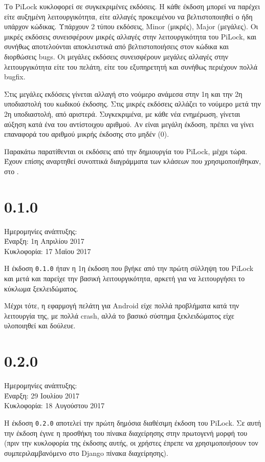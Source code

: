 Το PiLock κυκλοφορεί σε συγκεκριμένες εκδόσεις. Η κάθε έκδοση μπορεί να παρέχει είτε αυξημένη λειτουργικότητα, είτε αλλαγές προκειμένου να βελτιστοποιηθεί ο ήδη υπάρχον κώδικας. Υπάρχουν 2 τύπου εκδόσεις, Minor (μικρές), Major (μεγάλες). Οι μικρές εκδόσεις συνεισφέρουν μικρές αλλαγές στην λειτουργικότητα του PiLock, και συνήθως αποτελούνται αποκλειστικά από βελτιστοποιήσεις στον κώδικα και διορθώσεις bugs. Οι μεγάλες εκδόσεις συνεισφέρουν μεγάλες αλλαγές στην λειτουργικότητα είτε του πελάτη, είτε του εξυπηρετητή και συνήθως περιέχουν πολλά bugfix.

Στις μεγάλες εκδόσεις γίνεται αλλαγή στο νούμερο ανάμεσα στην 1η και την 2η υποδιαστολή του κωδικού έκδοσης. Στις μικρές εκδόσεις αλλάζει το νούμερο μετά την 2η υποδιαστολή, από αριστερά. Συγκεκριμένα, με κάθε νέα ενημέρωση, γίνεται αύξηση κατά ένα του αντίστοιχου αριθμού. Αν είναι μεγάλη έκδοση, πρέπει να γίνει επαναφορά του αριθμού μικρής έκδοσης στο μηδέν (0).

Παρακάτω παρατίθενται οι εκδόσεις από την δημιουργία του PiLock, μέχρι τώρα. Έχουν επίσης αναρτηθεί συνοπτικά διαγράμματα των κλάσεων που χρησιμοποιήθηκαν, στο .

\section{0.1.0}
	Ημερομηνίες ανάπτυξης:\\Έναρξη: 1η Απριλίου 2017\\Κυκλοφορία: 17 Μαϊου 2017

	Η έκδοση \verb|0.1.0| ήταν η 1η έκδοση που βγήκε από την πρώτη σύλληψη του PiLock και μετά και παρείχε την βασική λειτουργικότητα, αρκετή για να λειτουργήσει το κύκλωμα ξεκλειδώματος. 

	Μέχρι τότε, η εφαρμογή πελάτη για Android είχε πολλά προβλήματα κατά την λειτουργία της, με πολλά crash, αλλά το βασικό σύστημα ξεκλειδώματος είχε υλοποιηθεί και δούλευε.

\section{0.2.0}
	Ημερομηνίες ανάπτυξης:\\Έναρξη: 29 Ιουλίου 2017\\Κυκλοφορία: 18 Αυγούστου 2017

	Η έκδοση \verb|0.2.0| αποτελεί την πρώτη δημόσια διαθέσιμη έκδοση του PiLock. Σε αυτή την έκδοση έγινε η προσθήκη του πίνακα διαχείρησης στην πρωτογενή μορφή του (πριν την κυκλοφορία της έκδοσης αυτής, οι χρήστες έπρεπε να χρησιμοποιήσουν τον συμπεριλαμβανόμενο στο Django πίνακα διαχείρησης).

